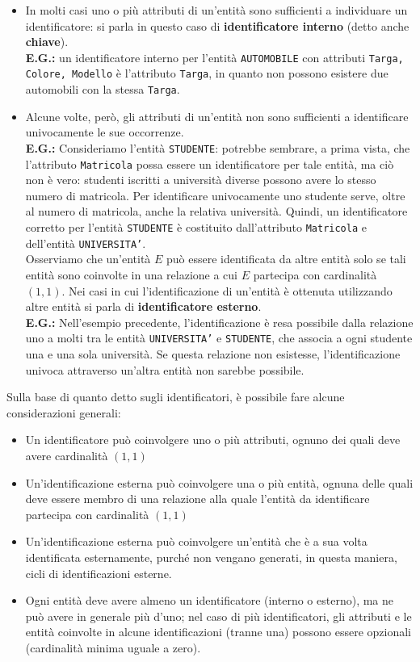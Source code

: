    \begin{itemize}
        \item{In molti casi uno o più attributi di un'entità sono sufficienti a individuare un identificatore: si parla in questo caso di \textbf{identificatore interno} (detto anche \textbf{chiave}).\\
        \textbf{E.G.:} un identificatore interno per l'entità \texttt{AUTOMOBILE} con attributi \texttt{Targa, Colore, Modello} è l'attributo \texttt{Targa}, in quanto non possono esistere due automobili con la stessa \texttt{Targa}.}
        \item{Alcune volte, però, gli attributi di un'entità non sono sufficienti a identificare univocamente le sue occorrenze.\\
        \textbf{E.G.:} Consideriamo l'entità \texttt{STUDENTE}: potrebbe sembrare, a prima vista, che l'attributo \texttt{Matricola} possa essere un identificatore per tale entità, ma ciò non è vero: studenti iscritti a università diverse possono avere lo stesso numero di matricola. Per identificare univocamente uno studente serve, oltre al numero di matricola, anche la relativa università. Quindi, un identificatore corretto per l'entità \texttt{STUDENTE} è costituito dall'attributo \texttt{Matricola} e dell'entità \texttt{UNIVERSITA'}.\\
        Osserviamo che un'entità $E$ può essere identificata da altre entità solo se tali entità sono coinvolte in una relazione a cui $E$ partecipa con cardinalità $(1, 1)$. Nei casi in cui l'identificazione di un'entità è ottenuta utilizzando altre entità si parla di \textbf{identificatore esterno}.\\
        \textbf{E.G.:} Nell'esempio precedente, l'identificazione è resa possibile dalla relazione uno a molti tra le entità \texttt{UNIVERSITA'} e \texttt{STUDENTE}, che associa a ogni studente una e una sola università. Se questa relazione non esistesse, l'identificazione univoca attraverso un'altra entità non sarebbe possibile.}
    \end{itemize}
Sulla base di quanto detto sugli identificatori, è possibile fare alcune considerazioni generali:
    \begin{itemize}
        \item{Un identificatore può coinvolgere uno o più attributi, ognuno dei quali deve avere cardinalità $(1,1)$}
        \item{Un'identificazione esterna può coinvolgere una o più entità, ognuna delle quali deve essere membro di una relazione alla quale l'entità da identificare partecipa con cardinalità $(1,1)$}
        \item{Un'identificazione esterna può coinvolgere un'entità che è a sua volta identificata esternamente, purché non vengano generati, in questa maniera, cicli di identificazioni esterne.}
        \item{Ogni entità deve avere almeno un identificatore (interno o esterno), ma ne può avere in generale più d'uno; nel caso di più identificatori, gli attributi e le entità coinvolte in alcune identificazioni (tranne una) possono essere opzionali (cardinalità minima uguale a zero).}
    \end{itemize}
